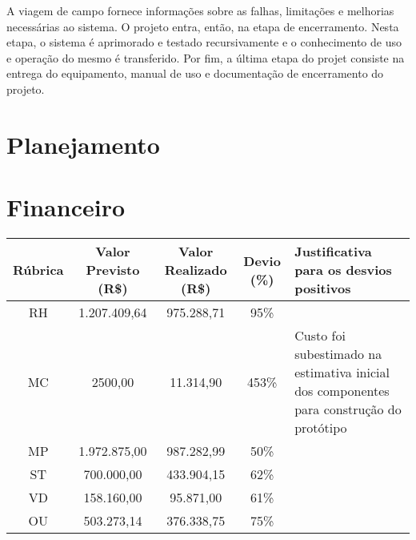A viagem de campo fornece informações sobre as falhas, limitações e melhorias 
necessárias ao sistema. O projeto entra, então, na etapa de encerramento. Nesta 
etapa, o sistema é aprimorado e testado recursivamente e o conhecimento de uso e 
operação do mesmo é transferido. Por fim, a última etapa do projet consiste na
entrega do equipamento, manual de uso e documentação de encerramento do projeto.

\section{Planejamento}



\section{Financeiro}
\begin{center}
  \begin{tabular}{ | c | c | c | c | p{4.9cm} | }
    \hline
        \textbf{Rúbrica} & \textbf{Valor Previsto (R\$)} & \textbf{Valor Realizado (R\$)} & \textbf{Devio (\%)} & \textbf{Justificativa para os desvios positivos} \\ \hline
    RH & 1.207.409,64 & 975.288,71 & 95\%  &  \\ \hline
    MC & 2500,00      & 11.314,90  & 453\% &  Custo foi subestimado na estimativa  inicial dos componentes para construção do protótipo \\ \hline
    MP & 1.972.875,00 & 987.282,99 & 50\%  &  \\ \hline
    ST & 700.000,00   & 433.904,15 & 62\%  &  \\ \hline
    VD & 158.160,00   & 95.871,00  & 61\%  &  \\ \hline
    OU & 503.273,14   & 376.338,75 & 75\%  &  \\ 
    \hline
  \end{tabular}
\end{center}




